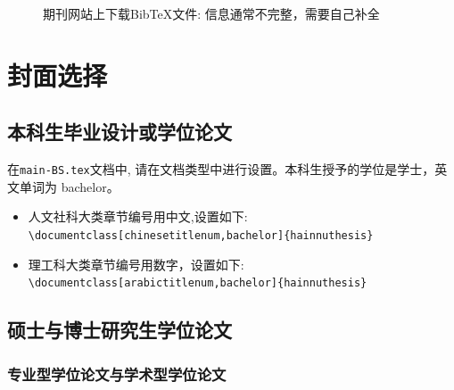 \begin{figure}[hp]
\centering
{} 
\caption{期刊网站上下载BibTeX文件: 信息通常不完整，需要自己补全}
\label{ref-infor-not-complete}
\end{figure}

\section{封面选择}

\subsection{本科生毕业设计或学位论文}
在\verb|main-BS.tex|文档中, 请在文档类型中进行设置。本科生授予的学位是学士，英文单词为
bachelor。
\begin{itemize}
\item 人文社科大类章节编号用中文,设置如下:\\
      \verb|\documentclass[chinesetitlenum,bachelor]{hainnuthesis}|
\item 理工科大类章节编号用数字，设置如下:\\
      \verb|\documentclass[arabictitlenum,bachelor]{hainnuthesis}|
\end{itemize}

\subsection{硕士与博士研究生学位论文}

\subsubsection{专业型学位论文与学术型学位论文}


